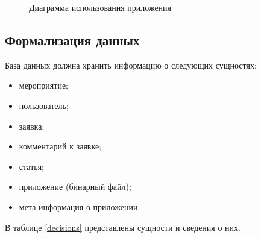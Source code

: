 \begin{figure}[h!]
	\caption{Диаграмма использования приложения}
	\label{fig:UseCase}
\end{figure}

\pagebreak

\subsection{Формализация данных}

База данных должна хранить информацию о следующих сущностях:

\begin{itemize}[label=---]
	\item мероприятие;
	\item пользователь;
	\item заявка;
	\item комментарий к заявке;
	\item статья;
	\item приложение (бинарный файл);
	\item мета-информация о приложении.
\end{itemize}


В таблице \ref{decisions} представлены сущности и сведения о них.

